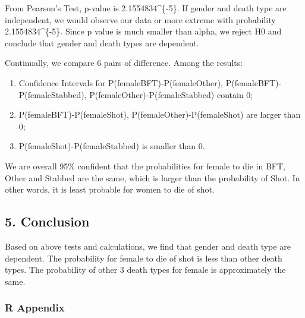\documentclass[]{article}
\begin{document}
 From Pearson's Test, p-value is 2.1554834\^{}\{-5\}. If gender
and death type are independent, we would observe our data or more
extreme with probability 2.1554834\^{}\{-5\}. Since p value is
much smaller than alpha, we reject H0 and conclude that gender and death
types are dependent.

Continually, we compare 6 pairs of difference. Among the results:

\begin{enumerate}
\def\labelenumi{\arabic{enumi}.}
\item
  Confidence Intervals for
  P(female\textbar{}BFT)-P(female\textbar{}Other),
  P(female\textbar{}BFT)-P(female\textbar{}Stabbed),
  P(female\textbar{}Other)-P(female\textbar{}Stabbed) contain 0;
\item
  P(female\textbar{}BFT)-P(female\textbar{}Shot),
  P(female\textbar{}Other)-P(female\textbar{}Shot) are larger than 0;
\item
  P(female\textbar{}Shot)-P(female\textbar{}Stabbed) is smaller than 0.
\end{enumerate}

We are overall 95\% confident that the probabilities for female to die
in BFT, Other and Stabbed are the same, which is larger than the
probability of Shot. In other words, it is least probable for women to
die of shot.

\subsection{5. Conclusion}\label{conclusion}

Based on above tests and calculations, we find that gender and death
type are dependent. The probability for female to die of shot is less
than other death types. The probability of other 3 death types for
female is approximately the same.

\subsubsection{R Appendix}\label{r-appendix}
\end{document}

